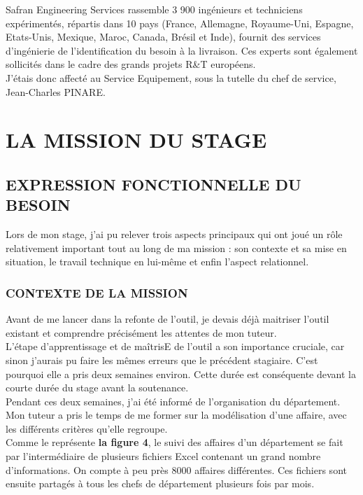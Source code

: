 Safran Engineering Services rassemble 3 900 ingénieurs et techniciens expérimentés, répartis dans 10 pays (France, Allemagne, Royaume-Uni, Espagne, Etats-Unis, Mexique, Maroc, Canada, Brésil et Inde), fournit des services d'ingénierie de l'identification du besoin à la livraison. Ces experts sont également sollicités dans le cadre des grands projets R\&T européens.\\ 

J’étais donc affecté au Service Equipement, sous la tutelle du chef de service, Jean-Charles PINARE.

\chapter{LA MISSION DU STAGE}
\section{EXPRESSION FONCTIONNELLE DU BESOIN }

	Lors de mon stage, j’ai pu relever trois aspects principaux qui ont joué un rôle relativement important tout au long de ma mission : son contexte et sa mise en situation, le travail technique en lui-même et enfin l’aspect relationnel.

\subsection{CONTEXTE DE LA MISSION }

Avant de me lancer dans la refonte de l’outil, je devais déjà maitriser l’outil existant et comprendre précisément les attentes de mon tuteur.\\

L’étape d’apprentissage et de  maîtrisE de l’outil a son importance cruciale, car sinon j’aurais pu faire les mêmes erreurs que le précédent stagiaire. C’est pourquoi elle a pris deux semaines environ. Cette durée est conséquente devant la courte durée du stage avant la soutenance.\\

Pendant ces deux semaines, j’ai été informé de l’organisation du département. Mon tuteur a pris le temps de me former sur la modélisation d’une affaire, avec les différents critères qu’elle regroupe.\\

Comme le représente \textbf {la figure 4}, le suivi des affaires d’un département se fait par l’intermédiaire de plusieurs fichiers Excel contenant un grand nombre d’informations. On compte à peu près 8000 affaires différentes. Ces fichiers sont ensuite partagés à tous les chefs de département plusieurs fois par mois.\\ 

